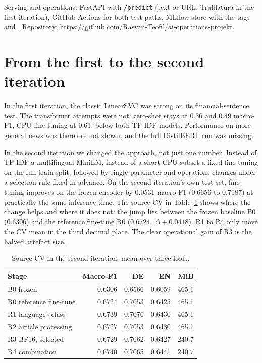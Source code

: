 \documentclass[12pt,toc=bib,toc=listof]{scrreprt}
\begin{document}
Serving and operations: FastAPI with \texttt{/predict} (text or URL, Trafilatura in the first iteration), GitHub Actions for both test paths, MLflow store  with the tags  and . Repository: \url{https://github.com/Rasvan-Teofil/ai-operations-projekt}.

\section{From the first to the second iteration}

In the first iteration, the classic LinearSVC was strong on its financial-sentence test. The transformer attempts were not: zero-shot stays at 0.36 and 0.49 macro-F1, CPU fine-tuning at 0.61, below both TF-IDF models. Performance on more general news was therefore not shown, and the full DistilBERT run was missing.

In the second iteration we changed the approach, not just one number. Instead of TF-IDF a multilingual MiniLM, instead of a short CPU subset a fixed fine-tuning on the full train split, followed by single parameter and operations changes under a selection rule fixed in advance. On the second iteration's own test set, fine-tuning improves on the frozen encoder by 0.0531 macro-F1 (0.6656 to 0.7187) at practically the same inference time. The source CV in Table~\ref{tab:ablation} shows where the change helps and where it does not: the jump lies between the frozen baseline B0 (0.6306) and the reference fine-tune R0 (0.6724, $\Delta +0.0418$). R1 to R4 only move the CV mean in the third decimal place. The clear operational gain of R3 is the halved artefact size.

\begin{table}[H]
\centering
\small
\caption{Source CV in the second iteration, mean over three folds.}
\label{tab:ablation}
\begin{tabular}{lrrrr}
\toprule
Stage & Macro-F1 & DE & EN & MiB \\
\midrule
B0 frozen & 0.6306 & 0.6566 & 0.6059 & 465.1 \\
R0 reference fine-tune & 0.6724 & 0.7053 & 0.6425 & 465.1 \\
R1 language$\times$class & 0.6739 & 0.7076 & 0.6430 & 465.1 \\
R2 article processing & 0.6727 & 0.7053 & 0.6430 & 465.1 \\
R3 BF16, selected & 0.6729 & 0.7062 & 0.6427 & 240.7 \\
R4 combination & 0.6740 & 0.7065 & 0.6441 & 240.7 \\
\bottomrule
\end{tabular}
\end{table}
\end{document}
